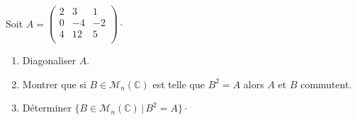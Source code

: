\documentclass[a4paper,10pt]{report}
\begin{document}
\begin{Exa} Soit $A= \begin{pmatrix}
2 & 3 & 1 \\
0 & -4 & -2 \\
4 & 12 & 5 \\
\end{pmatrix}\cdot$

\begin{enumerate}
\item Diagonaliser $A$.
\item Montrer que si $B \in \mathcal{M}_n(\mathbb{C})$ est telle que $B^2=A$ alors $A$ et $B$ commutent.
\item Déterminer $\lbrace B \in \mathcal{M}_n(\mathbb{C}) \, \vert \, B^2=A \rbrace \cdot$
\end{enumerate}
\end{Exa}

\corr 
\end{document}
